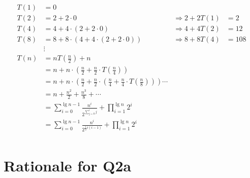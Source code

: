 \documentclass[12pt]{article}
\begin{document}
\begin{enumerate}
\begin{enumerate}
        \begin{align*}
            T(1) &= 0 \\
            T(2) &= 2 + 2 \cdot 0 &\Rightarrow 2 + 2T(1) &= 2 \\
            T(4) &= 4 + 4 \cdot (2 + 2 \cdot 0) &\Rightarrow 4 + 4T(2) &= 12 \\
            T(8) &= 8 + 8 \cdot (4 + 4 \cdot (2 + 2 \cdot 0)) &\Rightarrow 8 + 8T(4) &= 108 \\
            &\vdots \\
            T(n) &= nT(\tfrac{n}{2}) + n \\
            &= n + n \cdot (\tfrac{n}{2} + \tfrac{n}{2} \cdot T(\tfrac{n}{4})) \\
            &= n + n \cdot (\tfrac{n}{2} + \tfrac{n}{2} \cdot (\tfrac{n}{4} + \tfrac{n}{4} \cdot T(\tfrac{n}{8}))) \cdots \\
            &= n + \tfrac{n^{2}}{2} + \tfrac{n^{3}}{8} + \cdots \\
            &= \sum_{i = 0}^{\lg n - 1} \frac{n^{i}}{2^{\sum_{j = 0}^{i} j}} + \prod_{i = 1}^{\lg n} 2^{i} \\
            &= \sum_{i = 0}^{\lg n - 1} \frac{n^{i}}{2^{\frac{1}{2}i (i - 1)}} + \prod_{i = 1}^{\lg n} 2^{i} \\
        \end{align*}
    \end{enumerate}
\end{enumerate}

\appendix

\section{Rationale for Q2a}
\end{document}
